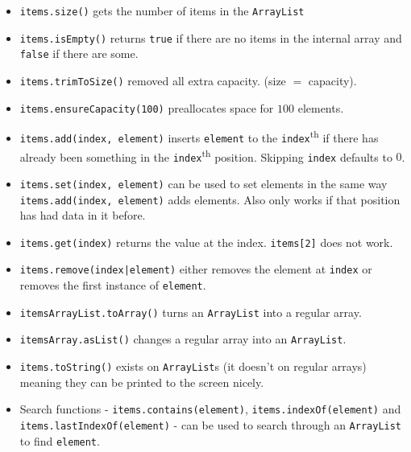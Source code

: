 \begin{itemize}
	\item \texttt{items.size()} gets the number of items in the \texttt{ArrayList}
	\item \texttt{items.isEmpty()} returns \texttt{true} if there are no items in the internal array and \texttt{false} if there are some.
	\item \texttt{items.trimToSize()} removed all extra capacity. (size \(=\) capacity).
	\item \texttt{items.ensureCapacity(100)} preallocates space for \(100\) elements.
	\item \texttt{items.add(index, element)} inserts \texttt{element} to the \texttt{index}\textsuperscript{th} if there has already been something in the \texttt{index}\textsuperscript{th} position. Skipping \texttt{index} defaults to \(0\).
	\item \texttt{items.set(index, element)} can be used to set elements in the same way \texttt{items.add(index, element)} adds elements. Also only works if that position has had data in it before.
	\item \texttt{items.get(index)} returns the value at the index. \texttt{items[2]} does not work.
	\item \texttt{items.remove(index|element)} either removes the element at \texttt{index} or removes the first instance of \texttt{element}.
	\item \texttt{itemsArrayList.toArray()} turns an \texttt{ArrayList} into a regular array.
	\item \texttt{itemsArray.asList()} changes a regular array into an \texttt{ArrayList}.
	\item \texttt{items.toString()} exists on \texttt{ArrayList}s (it doesn't on regular arrays) meaning they can be printed to the screen nicely.
	\item Search functions - \texttt{items.contains(element)}, \texttt{items.indexOf(element)} and \texttt{items.lastIndexOf(element)} - can be used to search through an \texttt{ArrayList} to find \texttt{element}.
\end{itemize}

